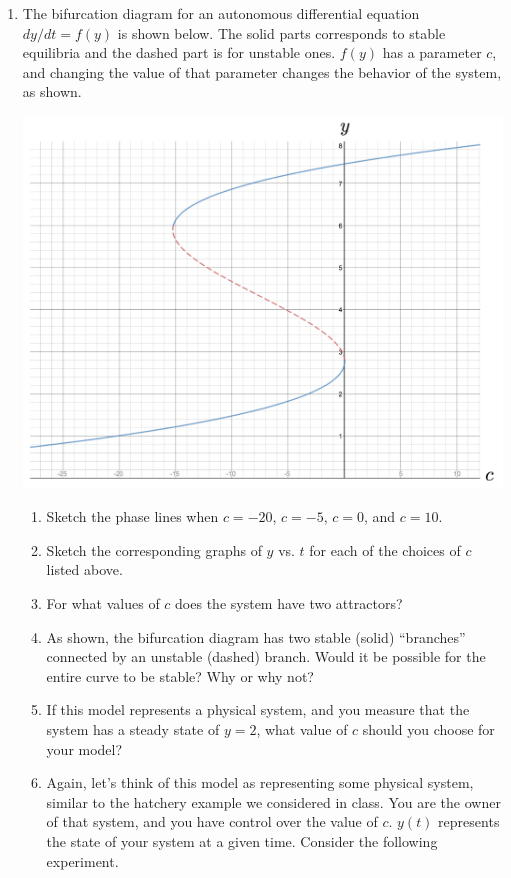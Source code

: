 \begin{enumerate}
\item The bifurcation diagram for an autonomous differential equation $dy/dt = f(y)$ is shown below.  The solid parts corresponds to stable equilibria and the dashed part is for unstable ones.  $f(y)$ has a parameter $c$, and changing the value of that parameter changes the behavior of the system, as shown.  \label{08HWproblem2} \\
\begin{center}
\includegraphics[width=5in]{08/08Bifurcation.png}
\end{center}
\clearpage
\begin{enumerate}
\item Sketch the phase lines when $c=-20$, $c=-5$, $c=0$, and $c=10$. \label{08HWproblem2parta}
\item Sketch the corresponding graphs of $y$ vs. $t$ for each of the choices of $c$ listed above. \label{08HWproblem2partb}
\item For what values of $c$ does the system have two attractors? \label{08HWproblem2partc}
\item As shown, the bifurcation diagram has two stable (solid) ``branches'' connected by an unstable (dashed) branch. Would it be possible for the entire curve to be stable? Why or why not?	 \label{08HWproblem2partd}
\item If this model represents a physical system, and you measure that the system has a steady state of $y = 2$, what value of $c$ should you choose for your model? \label{08HWproblem2parte}
\item Again, let's think of this model as representing some physical system, similar to the hatchery example we considered in class. You are the owner of that system, and you have control over the value of $c$. $y(t)$ represents the state of your system at a given time. Consider the following experiment. \label{08HWproblem2partf}

\end{enumerate}
\end{enumerate}
